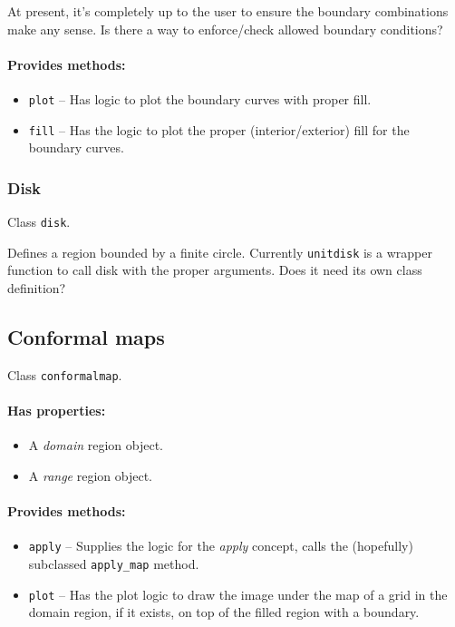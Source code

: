 \documentclass[12pt]{article}
\begin{document}
At present, it's completely up to the user to ensure the boundary combinations make any sense. Is there a way to enforce/check allowed boundary conditions?

\paragraph{Provides methods:}
\begin{itemize}
  \item \verb+plot+ -- Has logic to plot the boundary curves with proper fill.
  \item \verb+fill+ -- Has the logic to plot the proper (interior/exterior) fill for the boundary curves.
\end{itemize}

\subsubsection{Disk}
Class \verb+disk+.

Defines a region bounded by a finite circle. Currently \verb+unitdisk+ is a wrapper function to call disk with the proper arguments. Does it need its own class definition?

\subsection{Conformal maps}
Class \verb+conformalmap+.

\paragraph{Has properties:}
\begin{itemize}
  \item A \emph{domain} region object.
  \item A \emph{range} region object.
\end{itemize}

\paragraph{Provides methods:}
\begin{itemize}
  \item \verb+apply+ -- Supplies the logic for the \emph{apply} concept, calls the (hopefully) subclassed \verb+apply_map+ method.
  \item \verb+plot+ -- Has the plot logic to draw the image under the map of a grid in the domain region, if it exists, on top of the filled region with a boundary.
\end{itemize}
\end{document}
